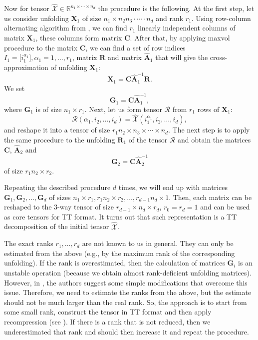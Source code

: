 Now for tensor $\widehat{\mathcal{X}} \in \mathbb{R}^{n_1 \times \cdots \times n_d}$ the procedure is the following.
At the first step, let us consider unfolding $\mathbf{X}_1$ of size
$n_1 \times n_2 n_3 \cdot \cdots \cdot n_d$ and rank $r_1$.
Using row-column alternating algorithm from \citep{tyrtyshnikov2000incomplete}, we can find $r_1$ linearly independent columns of matrix $\mathbf{X}_1$, these columns form matrix $\mathbf{C}$.
After that, by applying maxvol procedure \citep{tyrtyshnikov2000incomplete} to the matrix $\mathbf{C}$, we can find a set of row indices $I_1 = \big[i_1^{\alpha_1} \big], \alpha_1 = 1, \ldots, r_1$, matrix $\mathbf{R}$ and matrix $\widehat{\mathbf{A}}_1$
that will give the cross-approximation of unfolding $\mathbf{X}_1$:
\[
    \mathbf{X}_1 = \mathbf{C}\widehat{\mathbf{A}}_1^{-1}\mathbf{R}.
\]
We set
\[
    \mathbf{G}_1 = \mathbf{C}\widehat{\mathbf{A}}_1^{-1},
\]
where $\mathbf{G}_1$ is of size $n_1 \times r_1$.
Next, let us form tensor $\mathcal{R}$ from $r_1$ rows of $\mathbf{X}_1$:
\[
    \mathcal{R}(\alpha_1, i_2, \ldots, i_d) = \widehat{\mathcal{X}}(i_1^{\alpha_1}, i_2, \ldots, i_d),
\]
and reshape it into a tensor of size $r_1n_2 \times n_3 \times \cdots \times n_d$.
The next step is to apply the same procedure to the unfolding $\mathbf{R}_1$ of the tensor $\mathcal{R}$ and obtain the matrices $\mathbf{C}$, $\widehat{\mathbf{A}}_2$ and
\[
    \mathbf{G}_2 = \mathbf{C} \widehat{\mathbf{A}}_2^{-1}
\]
of size $r_1n_2 \times r_2$.

Repeating the described procedure $d$ times, we will end up with matrices
$\mathbf{G}_1, \allowbreak \mathbf{G}_2, \ldots, \mathbf{G}_d$ of sizes $n_1 \times r_1, r_1n_2 \times r_2, \ldots, r_{d-1}n_d \times 1$.
Then, each matrix can be reshaped to the $3$-way tensor of size $r_{d - 1} \times n_d \times r_d$,
$r_0 = r_d = 1$ and can be used as core tensors for TT format.
It turns out that such representation is a TT decomposition of the initial tensor $\widehat{\mathcal{X}}$.

The exact ranks $r_1, \ldots, r_d$ are not known to us in general.
They can only be estimated from the above (e.g., by the maximum rank of the corresponding unfolding).
If the rank is overestimated, then the calculation of matrices $\mathbf{G}_i$
is an unstable operation (because we obtain almost rank-deficient unfolding matrices).
However, in \citep{oseledets2010tt}, the authors suggest some simple modifications that overcome this issue.
Therefore, we need to estimate the ranks from the above, but
the estimate should not be much larger than the real rank.
So, the approach is to start from some small rank, construct the tensor
in TT format and then apply recompression (see \citep{oseledets2011tensor}).
If there is a rank that is not reduced, then we underestimated that rank and should then increase it and repeat the procedure.

